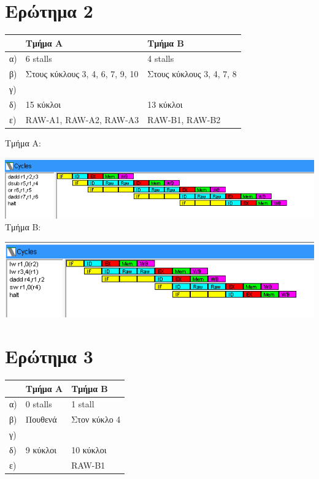 \documentclass[12pt]{article}
\begin{document}
\section{Ερώτημα 2}

\begin{center}
\begin{tabular}{|l|l|l|}
	\hline
	& \textbf{Τμήμα Α} & \textbf{Τμήμα Β} \\ 	
	\hline
	α) & 6 stalls & 4 stalls \\
	\hline
	β) & Στους κύκλους 3, 4, 6, 7, 9, 10 & Στους κύκλους 3, 4, 7, 8 \\
	\hline
	γ) & & \\
	\hline
	δ) & 15 κύκλοι & 13 κύκλοι \\
	\hline
	ε) & RAW-A1, RAW-A2, RAW-A3 & RAW-B1, RAW-B2 \\
	\hline
\end{tabular}
\end{center}

Τμήμα Α:

\includegraphics[width=\textwidth]{res/nofwd_p1.png} \\

Τμήμα Β:

\includegraphics[width=\textwidth]{res/nofwd_p2.png}

\section{Ερώτημα 3}

\begin{center}
\begin{tabular}{|l|l|l|}
	\hline
	& \textbf{Τμήμα Α} & \textbf{Τμήμα Β} \\ 	
	\hline
	α) & 0 stalls & 1 stall \\
	\hline
	β) & Πουθενά & Στον κύκλο 4 \\
	\hline
	γ) &  & \\
	\hline
	δ) & 9 κύκλοι & 10 κύκλοι \\
	\hline
	ε) &  & RAW-B1  \\
	\hline
\end{tabular}
\end{center}
\end{document}
